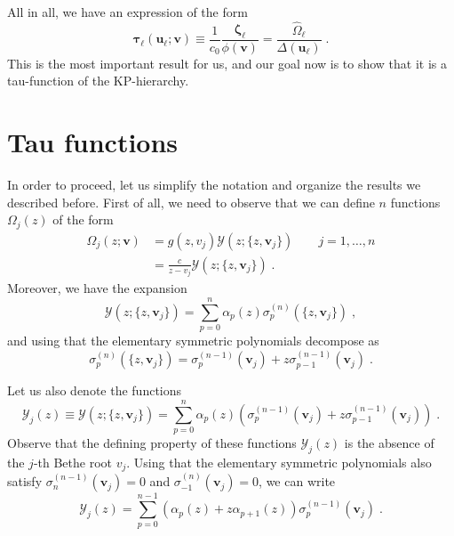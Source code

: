 \documentclass[a4paper,12pt]{amsart}
\begin{document}
All in all, we have an expression of the form
\begin{equation}
  \label{eq:slavnov-tau}
  \bm{\tau}_\ell(\bm{u}_\ell; \bm{v}) \equiv \frac{1}{c_0}\frac{\bm{\zeta}_\ell}{\phi(\bm{v})}
  = \frac{\hat{\Omega}_{\ell}}{\Delta(\bm{u}_\ell)} \; .
\end{equation}
This is the most important result for us, and our goal now is to show
that it is a tau-function of the KP-hierarchy.

\section{Tau functions}

In order to proceed, let us simplify the notation and organize the
results we described before. First of all, we need to observe
that we can define \(n\) functions \(\Omega_j(z)\) of the form
\begin{equation}
\begin{split}
  \Omega_{j}(z; \bm{v}) & = g(z, v_j) \mathcal{Y}(z; \{z, \bm{v}_j\})\qquad j =1, \dots, n\\
   & = \frac{c}{z - v_j} \mathcal{Y}(z; \{z, \bm{v}_j\})\; .
\end{split}
\end{equation}
Moreover, we have the expansion 
\begin{equation}
  \mathcal{Y}(z; \{z,\bm{v}_j\}) = \sum_{p=0}^n \alpha_p(z) \sigma_p^{(n)}(\{z,\bm{v}_j\})\; , 
\end{equation}
and using that the elementary symmetric polynomials decompose as
\begin{equation}
  \sigma_p^{(n)}(\{z,\bm{v}_j\}) = \sigma_p^{(n-1)}(\bm{v}_j) + z \sigma_{p-1}^{(n-1)}(\bm{v}_j) \; . 
\end{equation}

Let us also denote the functions
\begin{equation}
  \label{eq:y-functions-alpha}
  \mathcal{Y}_j(z)  \equiv  \mathcal{Y}(z; \{z,\bm{v}_j\})  = 
\sum_{p=0}^{n} \alpha_p(z)
  \left(\sigma_p^{(n-1)}(\bm{v}_j) + z \sigma_{p-1}^{(n-1)}(\bm{v}_j) \right) \; .
\end{equation}
Observe that the defining property of these functions
\(\mathcal{Y}_j(z)\) is the absence of the \(j\)-th Bethe root
\(v_j\).
Using that the elementary symmetric polynomials also satisfy \(\sigma_n^{(n-1)}(\bm{v}_j)=0\)
and \(\sigma_{-1}^{(n)}(\bm{v}_j)= 0\), we can write
\begin{equation}
  \label{eq:y-functions}
  \mathcal{Y}_j(z)  = 
  \sum_{p=0}^{n-1} 
   \left(\alpha_p(z) + z \alpha_{p+1}(z) \right) \sigma_p^{(n-1)}(\bm{v}_j) \; .
\end{equation}
\end{document}
